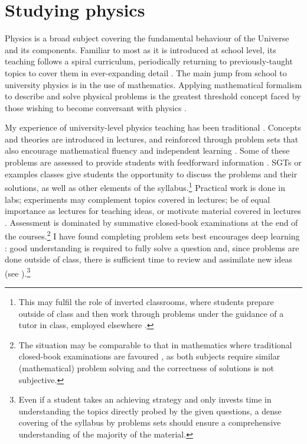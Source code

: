 \section{Studying physics}\label{sec:physics}

Physics is a broad subject covering the fundamental behaviour of the Universe and its components. Familiar to most as it is introduced at school level, its teaching follows a spiral curriculum, periodically returning to previously-taught topics to cover them in ever-expanding detail \citep{Bruner1960}. The main jump from school to university physics is in the use of mathematics. Applying mathematical formalism to describe and solve physical problems is the greatest threshold concept \citep{Meyer2003} faced by those wishing to become conversant with physics \citep{Wigner1960,Roth1994}.

My experience of university-level physics teaching has been traditional \citep[cf.][]{Iannone2015}. Concepts and theories are introduced in lectures, and reinforced through problem sets that also encourage mathematical fluency and independent learning \citep{Pike2015}. Some of these problems are assessed to provide students with feedforward information \citep{Bloxham2015}. SGTs or examples classes give students the opportunity to discuss the problems and their solutions, as well as other elements of the syllabus.\footnote{This may fulfil the role of inverted classrooms, where students prepare outside of class and then work through problems under the guidance of a tutor in class, employed elsewhere \citep{Lage2000}.} Practical work is done in labs; experiments may complement topics covered in lectures; %
be of equal importance as lectures for teaching ideas, %
or motivate material covered in lectures %
\citep{Hanif2009}. Assessment is dominated by summative closed-book examinations at the end of the courses.\footnote{The situation may be comparable to that in mathematics where traditional closed-book examinations are favoured \citep{Iannone2014}, as both subjects require similar (mathematical) problem solving and the correctness of solutions is not subjective.} I have found completing problem sets best encourages deep learning \citep{Marton1976,Marton1976a}: good understanding is required to fully solve a question and, since problems are done outside of class, there is sufficient time to review and assimilate new ideas (see ).\footnote{Even if a student takes an achieving strategy \citep[chapter 2]{Biggs1987} and only invests time in understanding the topics directly probed by the given questions, a dense covering of the syllabus by problems sets should ensure a comprehensive understanding of the majority of the material.}

